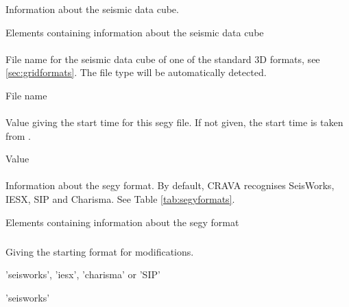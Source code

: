 \subsubsection{\necessary}
 \slist
   \item \Description Information about the seismic data cube.
   \item \Argument Elements containing information about the seismic data cube
   \item \Default
 \elist

\paragraph{\necessary}
 \slist
   \item \Description File name for the seismic data cube of one of the standard 3D formats, see \autoref{sec:gridformats}. The file
     type will be automatically detected.
   \item \Argument File name
   \item \Default
 \elist

\paragraph{}
 \slist
   \item \Description Value giving the start time for this segy file. If not given, the start time is taken from .
   \item \Argument Value
   \item \Default
 \elist

\paragraph{}
 \slist
   \item \Description Information about the segy format. By default, CRAVA recognises SeisWorks, IESX, SIP and Charisma. See Table \ref{tab:segyformats}.
   \item \Argument Elements containing information about the segy format
   \item \Default
 \elist

\subparagraph{}
 \slist
   \item \Description Giving the starting format for modifications.
   \item \Argument 'seisworks', 'iesx', 'charisma' or 'SIP'
   \item \Default 'seisworks'
 \elist

